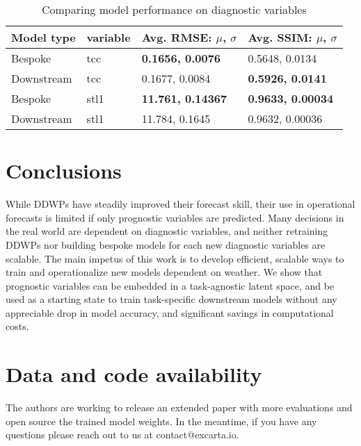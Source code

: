 \documentclass{article}
\begin{document}
\begin{table}[ht]
  \caption{Comparing model performance on diagnostic variables} 
  \label{results-table}
  \centering
  \begin{tabular}{llll}
    \toprule
    Model type    & variable & Avg. RMSE: $\mu$, $\sigma$    &  Avg. SSIM: $\mu$, $\sigma$  \\
    \midrule
    Bespoke   & tcc  & \textbf{0.1656, 0.0076}  & 0.5648, 0.0134  \\
    Downstream   & tcc & 0.1677, 0.0084  & \textbf{0.5926, 0.0141}   \\
    \midrule
    Bespoke   & stl1 & \textbf{11.761, 0.14367}  & \textbf{0.9633, 0.00034}  \\
    Downstream   & stl1 & 11.784, 0.1645  & 0.9632, 0.00036\\
    \bottomrule
  \end{tabular}
\end{table}



\section{Conclusions}

While DDWPs have steadily improved their forecast skill, their use in operational forecasts is limited if only prognostic variables are predicted. Many decisions in the real world are dependent on diagnostic variables, and neither retraining DDWPs nor building bespoke models for each new diagnostic variables are scalable. The main impetus of this work is to develop efficient, scalable ways to train and operationalize new models dependent on weather. We show that prognostic variables can be embedded in a task-agnostic latent space, and be used as a starting state to train task-specific downstream models without any appreciable drop in model accuracy, and significant savings in computational costs.

\newpage

\section{Data and code availability}

The authors are working to release an extended paper with more evaluations and open source the trained model weights. In the meantime, if you have any questions please reach out to us at contact@excarta.io.



\end{document}
